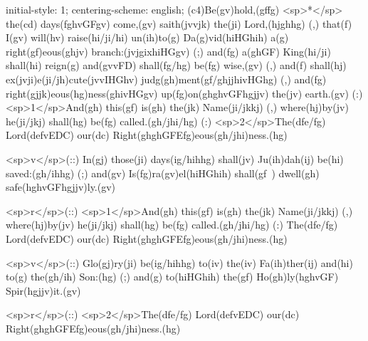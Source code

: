 initial-style: 1;
centering-scheme: english;
(c4)Be(gv)hold,(gffg) <sp>*</sp> the(cd) days(fghvGFgv) come,(gv) saith(jvvjk) the(ji) Lord,(hjghhg) (,) that(f) I(gv) will(hv) raise(hi/ji/hi) un(ih)to(g) Da(g)vid(hiHGhih) a(g) right(gf)eous(ghjv) branch:(jvjgixhiHGgv) (;) and(fg) a(ghGF) King(hi/ji) shall(hi) reign(g) and(gvvFD) shall(fg/hg) be(fg) wise,(gv) (,) and(f) shall(hj) ex(jvji)e(ji/jh)cute(jvvIHGhv) judg(gh)ment(gf/ghjjhivHGhg) (,) and(fg) right(gjjk)eous(hg)ness(ghivHGgv) up(fg)on(ghghvGFhgjjv) the(jv) earth.(gv) (:) <sp>1</sp>And(gh) this(gf) is(gh) the(jk) Name(ji/jkkj) (,) where(hj)by(jv) he(ji/jkj) shall(hg) be(fg) called.(gh/jhi/hg) (:) <sp>2</sp>The(dfe/fg) Lord(defvEDC) our(dc) Right(ghghGFEfg)eous(gh/jhi)ness.(hg) 

<sp>v</sp>(::) In(gj) those(ji) days(ig/hihhg) shall(jv) Ju(ih)dah(ij) be(hi) saved:(gh/ihhg) (;) and(gv) Is(fg)ra(gv)el(hiHGhih) shall(gf~) dwell(gh) safe(hghvGFhgjjv)ly.(gv) 

<sp>r</sp>(::) <sp>1</sp>And(gh) this(gf) is(gh) the(jk) Name(ji/jkkj) (,) where(hj)by(jv) he(ji/jkj) shall(hg) be(fg) called.(gh/jhi/hg) (:) The(dfe/fg) Lord(defvEDC) our(dc) Right(ghghGFEfg)eous(gh/jhi)ness.(hg) 

<sp>v</sp>(::) Glo(gj)ry(ji) be(ig/hihhg) to(iv) the(iv) Fa(ih)ther(ij) and(hi) to(g) the(gh/ih) Son:(hg) (;) and(g) to(hiHGhih) the(gf) Ho(gh)ly(hghvGF) Spir(hgjjv)it.(gv)

<sp>r</sp>(::) <sp>2</sp>The(dfe/fg) Lord(defvEDC) our(dc) Right(ghghGFEfg)eous(gh/jhi)ness.(hg) 
